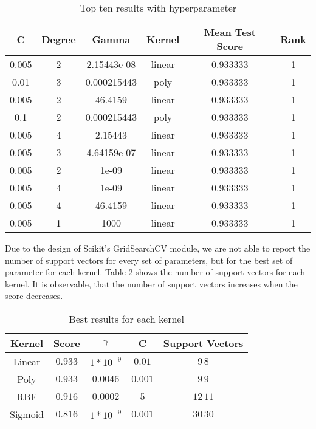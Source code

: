 \documentclass[a4paper,parskip=half-]{scrartcl}
\begin{document}
	
	\begin{table}[h!]
		\centering
		\begin{tabular}{|c|c|c|c|c|c|}
			\hline
			C     & Degree & Gamma       & Kernel & Mean Test Score & Rank \\ \hline
			0.005 & 2      & 2.15443e-08 & linear & 0.933333        & 1    \\ \hline
			0.01  & 3      & 0.000215443 & poly   & 0.933333        & 1    \\ \hline
			0.005 & 2      & 46.4159     & linear & 0.933333        & 1    \\ \hline
			0.1   & 2      & 0.000215443 & poly   & 0.933333        & 1    \\ \hline
			0.005 & 4      & 2.15443     & linear & 0.933333        & 1    \\ \hline
			0.005 & 3      & 4.64159e-07 & linear & 0.933333        & 1    \\ \hline
			0.005 & 2      & 1e-09       & linear & 0.933333        & 1    \\ \hline
			0.005 & 4      & 1e-09       & linear & 0.933333        & 1    \\ \hline
			0.005 & 4      & 46.4159     & linear & 0.933333        & 1    \\ \hline
			0.005 & 1      & 1000        & linear & 0.933333        & 1    \\ \hline
		\end{tabular}
	\caption{Top ten results with hyperparameter}
	\label{tab1}
	\end{table}

	Due to the design of Scikit's GridSearchCV module, we are not able to report the number of support vectors for every set of parameters, but for the best set of parameter for each kernel. Table \ref{tab2} shows the number of support vectors for each kernel. It is observable, that the number of support vectors increases when the score decreases.
	
	\begin{table}[h!]
		\centering
		\begin{tabular}{|c|c|c|c|c|}
			\hline
			Kernel  & Score & $\gamma$        & C     & Support Vectors        \\ \hline
			Linear  & $0.933$ & $1*10^{-9}$ & $0.01$  & $9\, 8$   \\ \hline
			Poly    & $0.933$ & $0.0046$                       & $0.001$ & $9\, 9$   \\ \hline
			RBF     & $0.916$ & $0.0002$                       & $5$     & $12\, 11$ \\ \hline
			Sigmoid & $0.816$ & $1*10^{-9}$ & $0.001$ & $30\, 30$ \\ \hline
		\end{tabular}
	\caption{Best results for each kernel}
	\label{tab2}
	\end{table}
	
\end{document}

